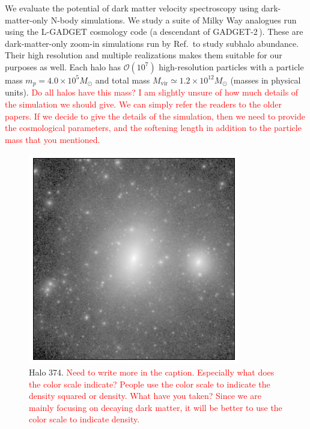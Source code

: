 \documentclass[aps,prd,10pt,twocolumn,superscriptaddress,showpacs]{revtex4-1}
\begin{document}
We evaluate the potential of dark matter velocity spectroscopy using dark-matter-only N-body simulations.  We study a suite of Milky Way analogues run using the L-GADGET cosmology code (a descendant of GADGET-2\,\cite{springel2005}). These are dark-matter-only zoom-in simulations run by Ref.\,\cite{mao2015} to study subhalo abundance. Their high resolution and multiple realizations makes them suitable for our purposes as well. Each halo has $\mathcal{O}(10^7)$ high-resolution particles with a particle mass $m_p=4.0 \times 10^5 M_{\odot}$ and total  mass $M_{\mathrm{vir}}\simeq1.2\times10^{12} M_{\odot}$ (masses in physical units).  \textcolor{red}{Do all halos have this mass?  I am slightly unsure of how much details of the simulation we should give.  We can simply refer the readers to the older papers.  If we decide to give the details of the simulation, then we need to provide the cosmological parameters, and the softening length in addition to the particle mass that you mentioned.}

\begin{figure}[h!]
\centering
\includegraphics[width=0.9\columnwidth]{halo374.png}
\caption{Halo 374.  \textcolor{red}{Need to write more in the caption.  Especially what does the color scale indicate?  People use the color scale to indicate the density squared or density.  What have you taken?  Since we are mainly focusing on decaying dark matter, it will be better to use the color scale to indicate density.}}
\label{fig:halo374}
\end{figure}
\end{document}
